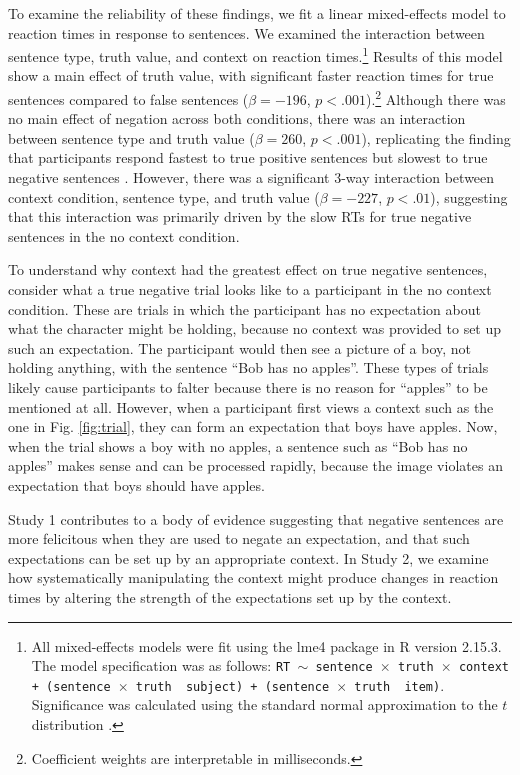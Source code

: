 \documentclass[10pt,letterpaper]{article}
\begin{document}
To examine the reliability of these findings, we fit a linear mixed-effects model to reaction times in response to sentences.  We examined the interaction between sentence type, truth value, and context on reaction times.\footnote{All mixed-effects models were fit using the lme4 package in R version 2.15.3.  The model specification was as follows: \texttt{RT $\sim$ sentence~$\times$~truth~$\times$~context + (sentence~$\times$~truth~\textbar~subject) +  (sentence~$\times$~truth~\textbar~item)}.  Significance was calculated using the standard normal approximation to the $t$ distribution \cite{barr2013}.}  Results of this model show a main effect of truth value, with significant faster reaction times for true sentences compared to false sentences ($\beta= -196$, $p< .001$).\footnote{Coefficient weights are interpretable in milliseconds.}  Although there was no main effect of negation across both conditions, there was an interaction between sentence type and truth value ($\beta= 260$, $p< .001$), replicating the finding that participants respond fastest to true positive sentences but slowest to true negative sentences  \cite{hclark1972}.  However, there was a significant 3-way interaction between context condition, sentence type, and truth value ($\beta= -227$, $p< .01$), suggesting that this interaction was primarily driven by the slow RTs for true negative sentences in the no context condition.  

To understand why context had the greatest effect on true negative sentences, consider what a true negative trial looks like to a participant in the no context condition.  These are trials in which the participant has no expectation about what the character might be holding, because no context was provided to set up such an expectation.  The participant would then see a picture of a boy, not holding anything, with the sentence ``Bob has no apples''.  These types of trials likely cause participants to falter because there is no reason for ``apples'' to be mentioned at all.  However, when a participant first views a context such as the one in Fig. \ref{fig:trial}, they can form an expectation that boys have apples.  Now, when the trial shows a boy with no apples, a sentence such as ``Bob has no apples'' makes sense and can be processed rapidly, because the image violates an expectation that boys should have apples.  

Study 1 contributes to a body of evidence suggesting that negative sentences are more felicitous when they are used to negate an expectation, and that such expectations can be set up by an appropriate context.  In Study 2, we examine how systematically manipulating the context might produce changes in reaction times by altering the strength of the expectations set up by the context.  
\end{document}
